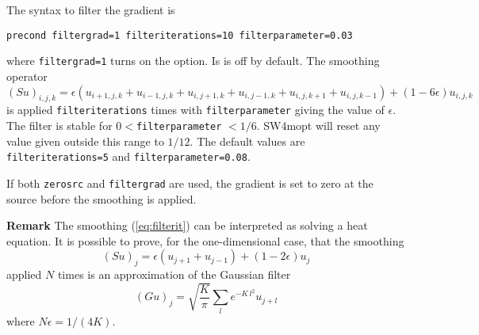 \documentclass[12pt]{report}
\begin{document}
The syntax to filter the gradient is
\begin{verbatim}
precond filtergrad=1 filteriterations=10 filterparameter=0.03
\end{verbatim}
where {\tt filtergrad=1} turns on the option. Is is off by default. The smoothing
operator
\begin{equation}
(Su)_{i,j,k}= \epsilon( u_{i+1,j,k} + u_{i-1,j,k}+u_{i,j+1,k} + u_{i,j-1,k}+u_{i,j,k+1} + u_{i,j,k-1})
+ (1-6\epsilon)u_{i,j,k}
\label{eq:filterit}
\end{equation}
is applied {\tt filteriterations} times with {\tt filterparameter} giving the value of $\epsilon$.
The filter is stable for $0< ${\tt filterparameter} $ < 1/6$. SW4mopt will reset any
value given outside this range to $1/12$.
The default values are {\tt filteriterations=5} and {\tt filterparameter=0.08}.

If both {\tt zerosrc} and {\tt filtergrad} are used, the gradient is set to zero at the
source before the smoothing is applied.
\par\noindent
{\bf Remark} The smoothing (\ref{eq:filterit}) can be interpreted as solving a heat 
equation. It is possible to prove, for the one-dimensional case, that the smoothing
$$
 (Su)_{j}= \epsilon( u_{j+1} + u_{j-1})+ (1-2\epsilon)u_{j}
$$
applied $N$ times is an approximation of the Gaussian filter
$$
 (Gu)_j = \sqrt{\frac{K}{\pi}}\sum_{l}e^{-K\,l^2}u_{j+l}
$$
where $N\epsilon=1/(4K)$. 
\end{document}
